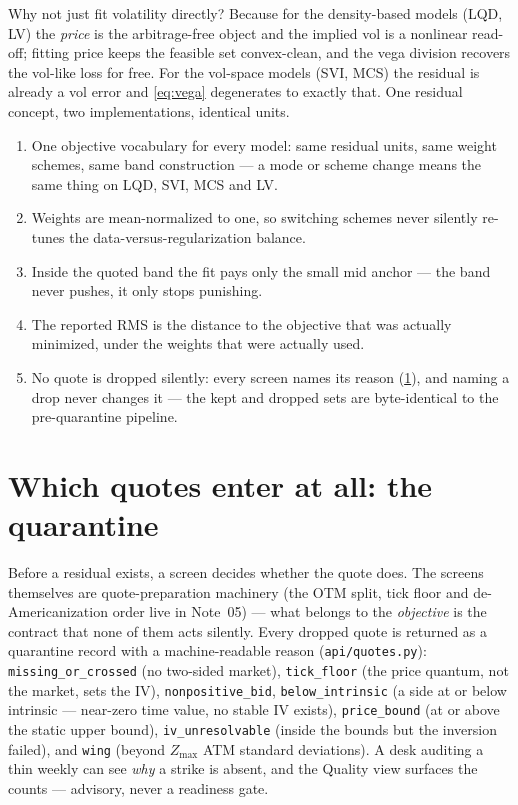 \documentclass[11pt]{article}
\begin{document}
\begin{heuristic}
Why not just fit volatility directly? Because for the density-based models
(LQD, LV) the \emph{price} is the arbitrage-free object and the implied vol is a
nonlinear read-off; fitting price keeps the feasible set convex-clean, and the
vega division recovers the vol-like loss for free. For the vol-space models
(SVI, MCS) the residual is already a vol error and \eqref{eq:vega} degenerates to
exactly that. One residual concept, two implementations, identical units.
\end{heuristic}

\begin{invariant}
\begin{enumerate}[leftmargin=1.6em]
\item One objective vocabulary for every model: same residual units, same
weight schemes, same band construction --- a mode or scheme change means the
same thing on LQD, SVI, MCS and LV.
\item Weights are mean-normalized to one, so switching schemes never silently
re-tunes the data-versus-regularization balance.
\item Inside the quoted band the fit pays only the small mid anchor ---
the band never pushes, it only stops punishing.
\item The reported RMS is the distance to the objective that was actually
minimized, under the weights that were actually used.
\item No quote is dropped silently: every screen names its reason
(\cref{sec:quarantine}), and naming a drop never changes it --- the kept and
dropped sets are byte-identical to the pre-quarantine pipeline.
\end{enumerate}
\end{invariant}

\section{Which quotes enter at all: the quarantine}
\label{sec:quarantine}

Before a residual exists, a screen decides whether the quote does. The
screens themselves are quote-preparation machinery (the OTM split, tick
floor and de-Americanization order live in Note~05) --- what belongs to the
\emph{objective} is the contract that none of them acts silently. Every
dropped quote is returned as a quarantine record with a machine-readable
reason (\texttt{api/quotes.py}): \texttt{missing\_or\_crossed} (no two-sided
market), \texttt{tick\_floor} (the price quantum, not the market, sets the
IV), \texttt{nonpositive\_bid}, \texttt{below\_intrinsic} (a side at or
below intrinsic --- near-zero time value, no stable IV exists),
\texttt{price\_bound} (at or above the static upper bound),
\texttt{iv\_unresolvable} (inside the bounds but the inversion failed), and
\texttt{wing} (beyond $Z_{\max}$ ATM standard deviations). A desk auditing a
thin weekly can see \emph{why} a strike is absent, and the Quality view
surfaces the counts --- advisory, never a readiness gate.
\end{document}
